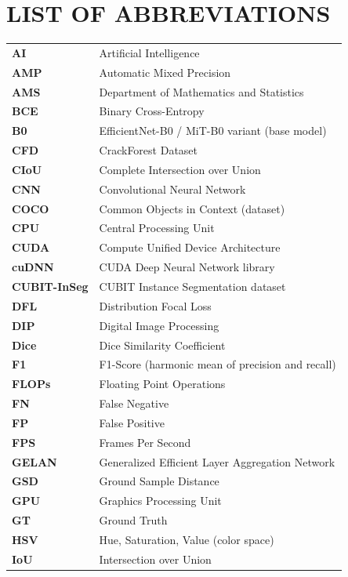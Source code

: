 \clearpage
{}
\chapter*{\centering LIST OF ABBREVIATIONS}

\begin{longtable}{@{} >{\bfseries}p{3cm} p{10.5cm} @{}}
 AI      & Artificial Intelligence \\
 AMP     & Automatic Mixed Precision \\
 AMS     & Department of Mathematics and Statistics \\
 BCE     & Binary Cross-Entropy \\
 B0      & EfficientNet-B0 / MiT-B0 variant (base model) \\
 CFD     & CrackForest Dataset \\
 CIoU    & Complete Intersection over Union \\
 CNN     & Convolutional Neural Network \\
 COCO    & Common Objects in Context (dataset) \\
 CPU     & Central Processing Unit \\
 CUDA    & Compute Unified Device Architecture \\
 cuDNN   & CUDA Deep Neural Network library \\
 CUBIT-InSeg & CUBIT Instance Segmentation dataset \\
 DFL     & Distribution Focal Loss \\
 DIP     & Digital Image Processing \\
 Dice    & Dice Similarity Coefficient \\
 F1      & F1-Score (harmonic mean of precision and recall) \\
 FLOPs   & Floating Point Operations \\
 FN      & False Negative \\
 FP      & False Positive \\
 FPS     & Frames Per Second \\
 GELAN   & Generalized Efficient Layer Aggregation Network \\
 GSD     & Ground Sample Distance \\
 GPU     & Graphics Processing Unit \\
 GT      & Ground Truth \\
 HSV     & Hue, Saturation, Value (color space) \\
 IoU     & Intersection over Union \\

\end{longtable}
